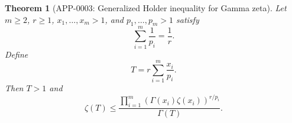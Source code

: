 \documentclass[11pt]{article}
\numberwithin{equation}{section}
\newtheorem{theorem}{Theorem}[section]
\theoremstyle{definition}
\theoremstyle{remark}
\newcommand{\1}{\mathbf 1}
\begin{document}
\begin{theorem}[APP-0003: Generalized Holder inequality for Gamma zeta]
\label{thm:sroysang-holder}
Let \(m\ge2\), \(r\ge1\), \(x_1,\ldots,x_m>1\), and \(p_1,\ldots,p_m>1\) satisfy
\begin{equation}
\label{eq:sroysang-holder-condition}
\sum_{i=1}^{m}\frac1{p_i}=\frac1r.
\end{equation}
Define
\begin{equation}
\label{eq:sroysang-t}
T=r\sum_{i=1}^{m}\frac{x_i}{p_i}.
\end{equation}
Then \(T>1\) and
\begin{equation}
\label{eq:sroysang-generalized-holder}
\zeta(T)\le
\frac{\prod_{i=1}^{m}(\Gamma(x_i)\zeta(x_i))^{r/p_i}}{\Gamma(T)}.
\end{equation}
\end{theorem}
\end{document}
